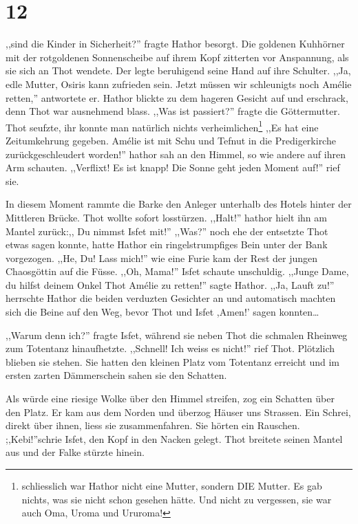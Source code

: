 \documentclass[11pt,titlepage,a5paper]{book}
\begin{document}
\section*{12}

,,sind die Kinder in Sicherheit?'' fragte Hathor besorgt. Die goldenen Kuhhörner mit der rotgoldenen Sonnenscheibe auf ihrem Kopf zitterten vor Anspannung, als sie sich an Thot wendete. Der legte beruhigend seine Hand auf ihre Schulter. ,,Ja, edle Mutter, Osiris kann zufrieden sein. Jetzt müssen wir schleunigts noch Amélie retten,'' antwortete er. Hathor blickte zu dem hageren Gesicht auf und erschrack, denn Thot war ausnehmend blass. ,,Was ist passiert?'' fragte die Göttermutter. Thot seufzte, ihr konnte man natürlich nichts verheimlichen\footnote{schliesslich war Hathor nicht eine Mutter, sondern DIE Mutter. Es gab nichts, was sie nicht schon gesehen hätte. Und nicht zu vergessen, sie war auch Oma, Uroma und Ururoma!} ,,Es hat eine Zeitumkehrung gegeben. Amélie ist mit Schu und Tefnut in die Predigerkirche zurückgeschleudert worden!'' hathor sah an den Himmel, so wie andere auf ihren Arm schauten. ,,Verflixt! Es ist knapp! Die Sonne geht jeden Moment auf!'' rief sie.

In diesem Moment rammte die Barke den Anleger unterhalb des Hotels hinter der Mittleren Brücke. Thot wollte sofort losstürzen. ,,Halt!'' hathor hielt ihn am Mantel zurück:,, Du nimmst Isfet mit!'' ,,Was?'' noch ehe der entsetzte Thot etwas sagen konnte, hatte Hathor ein ringelstrumpfiges Bein unter der Bank vorgezogen. ,,He, Du! Lass mich!'' wie eine Furie kam der Rest der jungen Chaosgöttin auf die Füsse. ,,Oh, Mama!'' Isfet schaute unschuldig. ,,Junge Dame, du hilfst deinem Onkel Thot Amélie zu retten!'' sagte Hathor. ,,Ja, Lauft zu!'' herrschte Hathor die beiden verduzten Gesichter an und automatisch machten sich die Beine auf den Weg, bevor Thot und Isfet ,Amen!' sagen konnten\dots

,,Warum denn ich?'' fragte Isfet, während sie neben Thot die schmalen Rheinweg zum Totentanz hinaufhetzte. ,,Schnell! Ich weiss es nicht!'' rief Thot. Plötzlich blieben sie stehen. Sie hatten den kleinen Platz vom Totentanz erreicht und im ersten zarten Dämmerschein sahen sie den Schatten.

Als würde eine riesige Wolke über den Himmel streifen, zog ein Schatten über den Platz. Er kam aus dem Norden und überzog Häuser uns Strassen. Ein Schrei, direkt über ihnen, liess sie zusammenfahren. Sie hörten ein Rauschen. ;,Kebi!''schrie Isfet, den Kopf in den Nacken gelegt. Thot breitete seinen Mantel aus und der Falke stürzte hinein.
\end{document}
